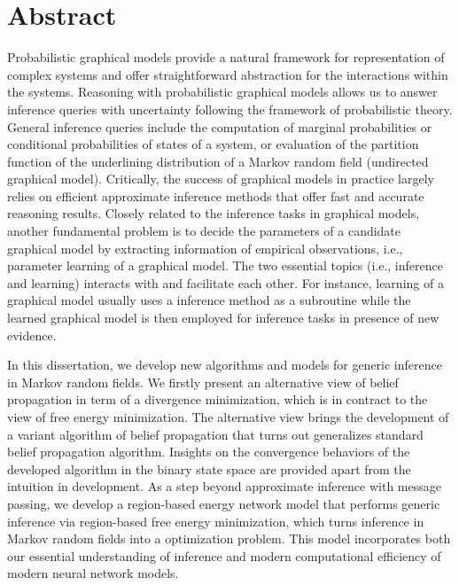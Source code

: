 \chapter{Abstract}
Probabilistic graphical models provide a natural framework for representation of complex systems and offer straightforward abstraction for the interactions within the systems. Reasoning with probabilistic graphical models allows us to answer inference queries with uncertainty following the framework of probabilistic theory. General inference queries include the computation of marginal probabilities or conditional probabilities of states of a system, or evaluation of the partition function of the underlining distribution of a Markov random field (undirected graphical model). Critically, the success of graphical models in practice largely relies on efficient approximate inference methods that offer fast and accurate reasoning results. Closely related to the inference tasks in graphical models, another fundamental problem is to decide the parameters of a candidate graphical model by extracting information of empirical observations, i.e., parameter learning of a graphical model. The two essential topics (i.e., inference and learning) interacts with and facilitate each other. For instance, learning of a graphical model usually uses a inference method as a subroutine while the learned graphical model is then employed for inference tasks in presence of new evidence.

In this dissertation, we develop new algorithms and models for generic inference in Markov random fields. We firstly present an alternative view of belief propagation in term of a divergence minimization, which is in contract to the view of free energy minimization. The alternative view brings the development of a variant algorithm of belief propagation that turns out generalizes standard belief propagation algorithm. Insights on the convergence behaviors of the developed algorithm in the binary state space are provided apart from the intuition in development. As a step beyond approximate inference with message passing, we develop a region-based energy network model that performs generic inference via region-based free energy minimization, which turns inference in Markov random fields into a optimization problem. This model incorporates both our essential understanding of inference and modern computational efficiency of modern neural network models.

